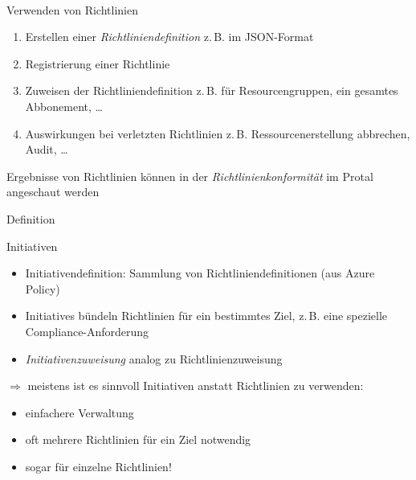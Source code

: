 \documentclass{scrartcl}
\newenvironment{flashcard}[2][]{%
    #1
    \vfill
    \centerline{\Large{#2}}
    \vfill
\newpage
}
{\newpage}
\begin{document}
    \begin{flashcard}[\ ]{Verwenden von Richtlinien}
        \begin{enumerate}
            \item Erstellen einer \emph{Richtliniendefinition}\newline
            z.\,B. im JSON-Format
            \item Registrierung einer Richtlinie
            \item Zuweisen der Richtliniendefinition\newline
            z.\,B. für Resourcengruppen, ein gesamtes Abbonement, \ldots
            \item Auswirkungen bei verletzten Richtlinien\newline
            z.\,B. Ressourcenerstellung abbrechen, Audit, \ldots
        \end{enumerate}
        
        \vspace{5mm}
        Ergebnisse von Richtlinien können in der \emph{Richtlinienkonformität} im Protal angeschaut werden
    \end{flashcard}
    
    \begin{flashcard}[Definition]{Initiativen}
        \begin{itemize}
            \item Initiativendefinition:\newline
            Sammlung von Richtliniendefinitionen (aus Azure Policy)
            \item Initiatives bündeln Richtlinien für ein bestimmtes Ziel, z.\,B. eine spezielle Compliance-Anforderung
            \item \emph{Initiativenzuweisung} analog zu Richtlinienzuweisung
        \end{itemize}
        
        \vspace{5mm}
        $\Rightarrow$ meistens ist es sinnvoll Initiativen anstatt Richtlinien zu verwenden:
        \begin{itemize}
            \item einfachere Verwaltung
            \item oft mehrere Richtlinien für ein Ziel notwendig
            \item sogar für einzelne Richtlinien!
        \end{itemize}

    \end{flashcard}
\end{document}
